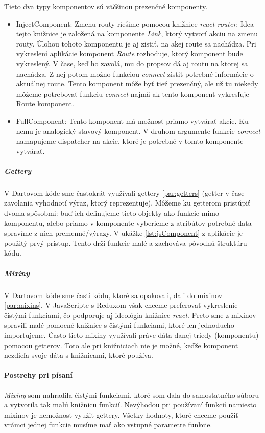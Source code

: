 Tieto dva typy komponentov sú väčšinou prezenčné komponenty.

\begin{itemize}
\item {InjectComponent}: Zmenu routy riešime pomocou knižnice \emph{react-router}. %
Idea tejto knižnice je založená na komponente \emph{Link}, ktorý vytvorí akciu na zmenu routy. Úlohou tohoto komponentu je aj zistiť, na akej route sa nachádza. 
Pri vykreslení aplikácie komponent \emph{Route} rozhoduje, ktorý komponent bude vykreslený. V čase, keď ho zavolá, mu do propsov dá aj routu na ktorej sa nachádza. Z nej potom možno funkciou \emph{connect} zistiť potrebné informácie o aktuálnej route. %
Tento komponent môže byť tiež prezenčný, ale už tu niekedy môžeme potrebovať funkciu \emph{connect} najmä ak tento komponent vykresľuje Route komponent.

\item {FullComponent}: Tento komponent má možnosť priamo vytvárať akcie. Ku nemu je analogický stavový komponent. V druhom argumente funkcie \emph{connect} namapujeme dispatcher na akcie, ktoré je potrebné v tomto komponente vytvárať.
\end{itemize}

\subparagraph{Gettery}
V Dartovom kóde sme častokrát využívali gettery \ref{par:getters} (getter v čase zavolania vyhodnotí výraz, ktorý reprezentuje). Môžeme ku getterom pristúpiť dvoma spôsobmi: buď ich definujeme tieto objekty ako funkcie mimo komponentu, alebo priamo v komponente vyberieme z atribútov potrebné data - spravíme z nich premenné/výrazy. V ukážke \ref{lst:jsComponent} z aplikácie je použitý prvý prístup. Tento drží funkcie malé a zachováva pôvodnú štruktúru kódu.

\subparagraph{Mixiny}
V Dartovom kóde sme časti kódu, ktoré sa opakovali, dali do mixinov \ref{par:mixins}. V JavaScripte s Reduxom však chceme preferovať vykreslenie čistými funkciami, čo podporuje aj ideológia knižnice \emph{react}. Preto sme z mixinov spravili malé pomocné knižnice s čistými funkciami, ktoré len jednoducho importujeme. Často tieto mixiny využívali práve dáta danej triedy (komponentu) pomocou getterov. Toto ale pri knižniciach nie je možné, keďže komponent nezdieľa svoje dáta s knižnicami, ktoré používa.

\paragraph{Postrehy pri písaní} \TODO{}
\emph{Mixiny} som nahradila čistými funkciami, ktoré som dala do samostatného súboru a vytvorila tak malú knižnicu funkcií.
Nevýhodou pri používaní funkcií namiesto mixinov je nemožnosť využiť gettery. Všetky hodnoty, ktoré chceme použiť vrámci jednej funkcie musíme mať ako vstupné parametre funkcie.


